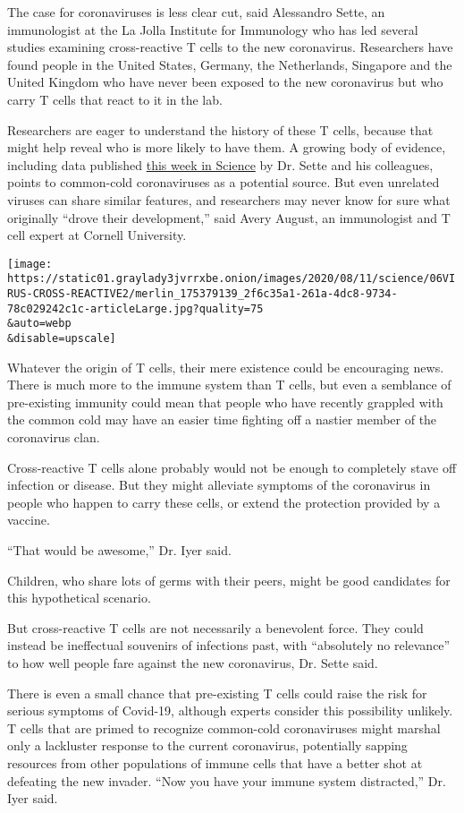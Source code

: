 The case for coronaviruses is less clear cut, said Alessandro Sette, an
immunologist at the La Jolla Institute for Immunology who has led
several studies examining cross-reactive T cells to the new coronavirus.
Researchers have found people in the United States, Germany, the
Netherlands, Singapore and the United Kingdom who have never been
exposed to the new coronavirus but who carry T cells that react to it in
the lab.

Researchers are eager to understand the history of these T cells,
because that might help reveal who is more likely to have them. A
growing body of evidence, including data published
\href{https://science.sciencemag.org/content/early/2020/08/04/science.abd3871}{this
week in Science} by Dr. Sette and his colleagues, points to common-cold
coronaviruses as a potential source. But even unrelated viruses can
share similar features, and researchers may never know for sure what
originally ``drove their development,'' said Avery August, an
immunologist and T cell expert at Cornell University.

\texttt{[image: https://static01.graylady3jvrrxbe.onion/images/2020/08/11/science/06VIRUS-CROSS-REACTIVE2/merlin\_175379139\_2f6c35a1-261a-4dc8-9734-78c029242c1c-articleLarge.jpg?quality=75\\\&auto=webp\\\&disable=upscale]}

Whatever the origin of T cells, their mere existence could be
encouraging news. There is much more to the immune system than T cells,
but even a semblance of pre-existing immunity could mean that people who
have recently grappled with the common cold may have an easier time
fighting off a nastier member of the coronavirus clan.

Cross-reactive T cells alone probably would not be enough to completely
stave off infection or disease. But they might alleviate symptoms of the
coronavirus in people who happen to carry these cells, or extend the
protection provided by a vaccine.

``That would be awesome,'' Dr. Iyer said.

Children, who share lots of germs with their peers, might be good
candidates for this hypothetical scenario.

But cross-reactive T cells are not necessarily a benevolent force. They
could instead be ineffectual souvenirs of infections past, with
``absolutely no relevance'' to how well people fare against the new
coronavirus, Dr. Sette said.

There is even a small chance that pre-existing T cells could raise the
risk for serious symptoms of Covid-19, although experts consider this
possibility unlikely. T cells that are primed to recognize common-cold
coronaviruses might marshal only a lackluster response to the current
coronavirus, potentially sapping resources from other populations of
immune cells that have a better shot at defeating the new invader. ``Now
you have your immune system distracted,'' Dr. Iyer said.

